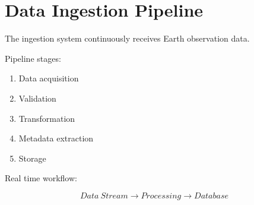 \section{Data Ingestion Pipeline}


The ingestion system continuously receives Earth observation
data.



Pipeline stages:


\begin{enumerate}

\item Data acquisition

\item Validation

\item Transformation

\item Metadata extraction

\item Storage

\end{enumerate}



Real time workflow:


\[
Data\ Stream
\rightarrow
Processing
\rightarrow
Database
\]

